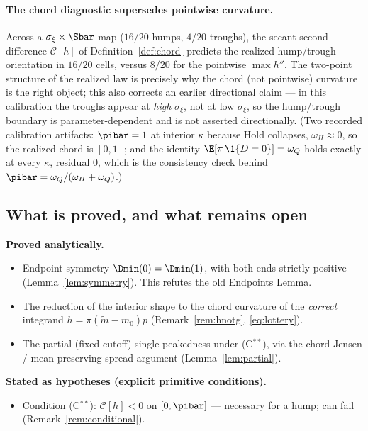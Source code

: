 \paragraph{The chord diagnostic supersedes pointwise curvature.}
Across a $\sigma_\xi\times\Sbar$ map ($16/20$ humps, $4/20$ troughs), the
secant second-difference $\mathcal{C}[h]$ of Definition~\ref{def:chord}
predicts the realized hump/trough orientation in $16/20$ cells, versus
$8/20$ for the pointwise $\max h''$. The two-point structure of the realized
law is precisely why the chord (not pointwise) curvature is the right object;
this also corrects an earlier directional claim --- in this calibration the
troughs appear at \emph{high} $\sigma_\xi$, not at low $\sigma_\xi$, so the
hump/trough boundary is parameter-dependent and is not asserted
directionally. (Two recorded calibration artifacts: $\pibar=1$ at interior
$\kappa$ because Hold collapses, $\omega_H\approx0$, so the realized chord is
$[0,1]$; and the identity $\E[\pi\,\1\{D=0\}]=\omega_Q$ holds exactly at
every $\kappa$, residual $0$, which is the consistency check behind
$\pibar=\omega_Q/(\omega_H+\omega_Q)$.)

\subsection*{What is proved, and what remains open}
\label{app:openpoints}

\noindent\textbf{Proved analytically.}
\begin{itemize}
\item Endpoint symmetry $\Dmin(0)=\Dmin(1)$, with both ends strictly
positive (Lemma~\ref{lem:symmetry}). This refutes the old Endpoints Lemma.
\item The reduction of the interior shape to the chord curvature of the
\emph{correct} integrand $h=\pi(\widetilde m-m_0)p$ (Remark~\ref{rem:hnotg},
\eqref{eq:lottery}).
\item The partial (fixed-cutoff) single-peakedness under (C$^{\ast\ast}$),
via the chord-Jensen / mean-preserving-spread argument
(Lemma~\ref{lem:partial}).
\end{itemize}

\noindent\textbf{Stated as hypotheses (explicit primitive conditions).}
\begin{itemize}
\item Condition (C$^{\ast\ast}$): $\mathcal{C}[h]<0$ on $[0,\pibar]$ ---
necessary for a hump; can fail (Remark~\ref{rem:conditional}).
\end{itemize}

